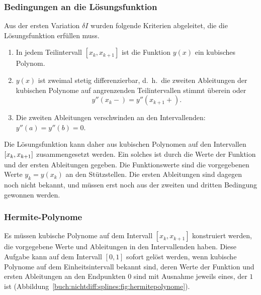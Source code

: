 %
%
\subsubsection{Bedingungen an die Lösungsfunktion}
Aus der ersten Variation $\delta I$ wurden folgende Kriterien abgeleitet,
die die Lösungsfunktion erfüllen muss.
\begin{enumerate}
\item
In jedem Teilintervall $[x_k,x_{k+1}]$ ist die Funktion $y(x)$ ein 
kubisches Polynom.
\item
$y(x)$ ist zweimal stetig differenzierbar, d.~h.~die zweiten Ableitungen
der kubischen Polynome auf angrenzenden Teilintervallen stimmt überein oder
\[
y''(x_k-) = y''(x_{k+1}+).
\]
\item
Die zweiten Ableitungen verschwinden an den Intervallenden: $y''(a)=y''(b)=0$.
\end{enumerate}
Die Lösungsfunktion kann daher aus kubischen Polynomen auf den
Intervallen $[x_{k\mathstrut},x_{k+1\mathstrut}]$ zusammengesetzt werden.
Ein solches ist durch die Werte der Funktion und der ersten Ableitungen
gegeben.
Die Funktionswerte sind die vorgegebenen Werte $y_k=y(x_k)$ an den
Stützstellen.
Die ersten Ableitungen sind dagegen noch nicht bekannt, und müssen erst noch
aus der zweiten und dritten Bedingung gewonnen werden.

%
%
\subsubsection{Hermite-Polynome}

Es müssen kubische Polynome auf dem Intervall $[x_k,x_{k+1}]$ konstruiert
werden, die vorgegebene Werte und Ableitungen in den Intervallenden haben.
Diese Aufgabe kann auf dem Intervall $[0,1]$ sofort gelöst werden,
wenn kubische Polynome auf dem Einheitsintervall bekannt sind, deren
Werte der Funktion und ersten Ableitungen an den Endpunkten $0$ sind
mit Ausnahme jeweils eines, der $1$ ist
(Abbildung~\ref{buch:nichtdiff:splines:fig:hermitepolynome}).

